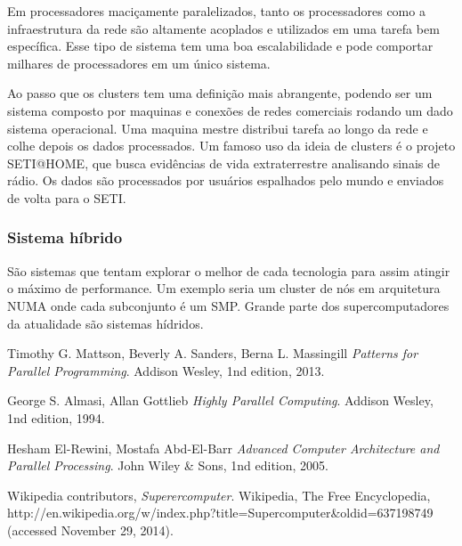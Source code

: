 \documentclass[a4paper]{article}
\begin{document}
Em processadores maciçamente paralelizados, tanto os processadores como a infraestrutura da rede são altamente acoplados e utilizados em uma tarefa bem específica. Esse tipo de sistema tem uma boa escalabilidade e pode comportar milhares de processadores em um único sistema.

Ao passo que os clusters tem uma definição mais abrangente, podendo ser um sistema composto por maquinas e conexões de redes comerciais rodando um dado sistema operacional. Uma maquina mestre distribui tarefa ao longo da rede e colhe depois os dados processados. Um famoso uso da ideia de clusters é o projeto SETI@HOME, que busca evidências de vida extraterrestre analisando sinais de rádio. Os dados são processados por usuários espalhados pelo mundo e enviados de volta para o SETI.

\subsubsection{Sistema híbrido}
São sistemas que tentam explorar o melhor de cada tecnologia para assim atingir o máximo de performance. Um exemplo seria um cluster de nós em arquitetura NUMA onde cada subconjunto é um SMP. Grande parte dos supercomputadores da atualidade são sistemas hídridos.
\newpage


\begin{thebibliography}{9}

   Timothy G. Mattson, Beverly A. Sanders, Berna L. Massingill 
  \emph{Patterns for Parallel Programming}.
  Addison Wesley,
  1nd edition,
  2013.

   George S. Almasi, Allan Gottlieb
  \emph{Highly Parallel Computing}.
  Addison Wesley,
  1nd edition,
  1994.

    Hesham El-Rewini, Mostafa Abd-El-Barr
  \emph{Advanced Computer Architecture and Parallel Processing}.
  John Wiley \& Sons,
  1nd edition,
  2005.

    Wikipedia contributors,
  \emph{Superercomputer}.
  Wikipedia, The Free Encyclopedia, http://en.wikipedia.org/w/index.php?title=Supercomputer\&oldid=637198749 (accessed November 29, 2014).

\end{thebibliography}
\end{document}
